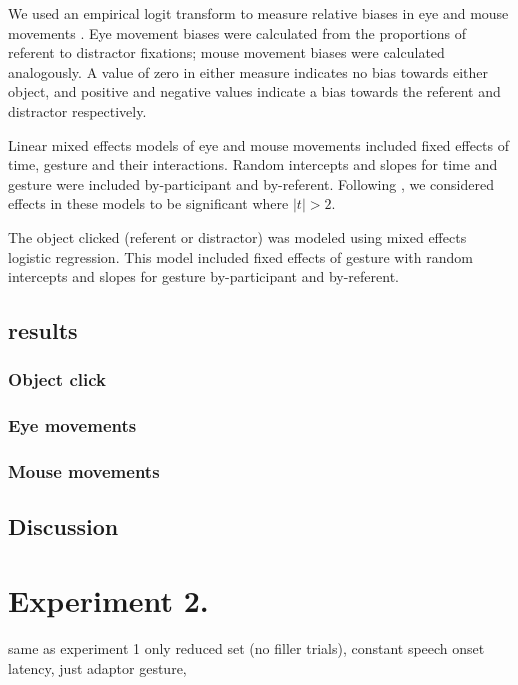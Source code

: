 \documentclass[a4paper,man,natbib]{apa6}
\begin{document}
We used an empirical logit transform to measure relative biases in eye and mouse movements \citep{Barr2008}.
Eye movement biases were calculated from the proportions of referent to distractor fixations;
mouse movement biases were calculated analogously.
A value of zero in either measure indicates no bias towards either object, and positive and negative values indicate a bias towards the referent and distractor respectively.

Linear mixed effects models of eye and mouse movements included fixed effects of time, gesture and their interactions.
Random intercepts and slopes for time and gesture were included by-participant and by-referent.
Following \citet{baayen2008analyzing}, we considered effects in these models to be significant where $|t|>2$.

The object clicked (referent or distractor) was modeled using mixed effects logistic regression.
This model included  fixed effects of gesture with random intercepts and slopes for gesture by-participant and by-referent.

\subsection{results}
\subsubsection{Object click}
\subsubsection{Eye movements}
\subsubsection{Mouse movements}

\subsection{Discussion}











\section{Experiment 2.}
same as experiment 1 only reduced set (no filler trials), constant speech onset latency, just adaptor gesture, 
\end{document}
